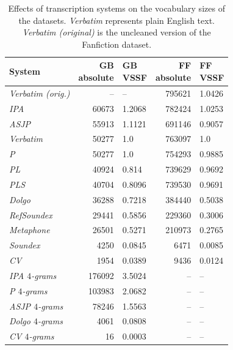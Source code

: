 \begin{table}
\caption{Effects of transcription systems on the vocabulary sizes of the datasets. \textit{Verbatim} represents plain English text. \textit{Verbatim (original)} is the uncleaned version of the Fanfiction dataset.}
\label{tab:system_characteristics}
\centering\small
\begin{tabular}{@{}l@{\hspace{1\tabcolsep}}rlrl@{}} %
\toprule
\bf System & \bf \specialcell{GB\\absolute} & \bf \specialcell{GB\\VSSF} & \bf \specialcell{FF\\absolute} & \bf \specialcell{FF\\VSSF} \\
\midrule
\textit{Verbatim (orig.)} & -- & -- & 795621 & 1.0426 \\
\textit{IPA} & 60673 & 1.2068 & 782424 & 1.0253 \\
\textit{ASJP} & 55913 & 1.1121 & 691146 & 0.9057 \\
\textit{Verbatim} & 50277 & 1.0 & 763097 & 1.0 \\
\textit{P} & 50277 & 1.0 & 754293 & 0.9885 \\
\textit{PL} & 40924 & 0.814 & 739629 & 0.9692 \\
\textit{PLS} & 40704 & 0.8096 & 739530 & 0.9691 \\
\textit{Dolgo} & 36288 & 0.7218 & 384440 & 0.5038 \\
\textit{RefSoundex} & 29441 & 0.5856 & 229360 & 0.3006 \\
\textit{Metaphone} & 26501 & 0.5271 & 210973 & 0.2765 \\
\textit{Soundex} & 4250 & 0.0845 & 6471 & 0.0085 \\
\textit{CV} & 1954 & 0.0389 & 9436 & 0.0124 \\
\textit{IPA $4$-grams} & 176092 & 3.5024 & -- & -- \\
\textit{P $4$-grams} & 103983 & 2.0682 & -- & -- \\
\textit{ASJP $4$-grams} & 78246 & 1.5563 & -- & -- \\
\textit{Dolgo $4$-grams} & 4061 & 0.0808 & -- & -- \\
\textit{CV $4$-grams} & 16 & 0.0003 & -- & -- \\
\bottomrule
\end{tabular}
\end{table}
